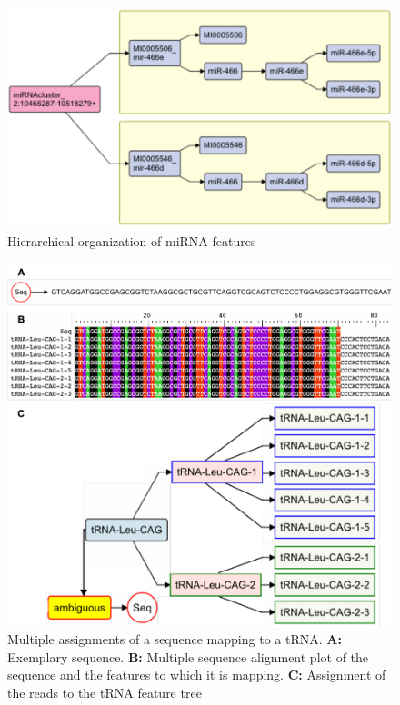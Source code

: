 \documentclass[12pt,twoside]{reedthesis}
\begin{document}
\begin{figure}[H]

{\centering \includegraphics{thesis_files/figure-latex/3f10-1} 

}

\caption{Hierarchical organization of miRNA features}\label{fig:3f10}
\end{figure}

\begin{figure}[H]

{\centering \includegraphics{thesis_files/figure-latex/3f11-1} 

}

\caption{Multiple assignments of a sequence mapping to a tRNA. \textbf{A:} Exemplary sequence. \textbf{B:} Multiple sequence alignment plot of the sequence and the features to which it is mapping. \textbf{C:} Assignment of the reads to the tRNA feature tree}\label{fig:3f11}
\end{figure}
\end{document}

